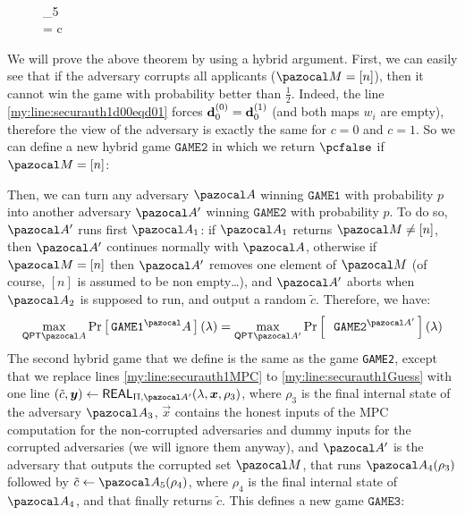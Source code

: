 \begin{proofE}
\begin{figure}[htb]
{{        \\
        \label{my:line:securauth1Guess} \gets \cA_5\\
        \pcreturn {} = c
      }}
    \caption{}
    \label{fig:gameFormalBlindAuthBlindCanDist}
  \end{figure}
  We will prove the above theorem by using a hybrid argument. First, we can easily see that if the adversary corrupts all applicants ($\cM = [n]$), then it cannot win the game with probability better than $\frac{1}{2}$. Indeed, the line \ref{my:line:securauth1d00eqd01} forces $\mathbf{d}_0^{(0)}=\mathbf{d}_0^{(1)}$ (and both maps $w_i$ are empty), therefore the view of the adversary is exactly the same for $c=0$ and $c=1$. So we can define a new hybrid game $\texttt{GAME2}$ in which we return $\pcfalse$ if $\cM = [n]$:
  \begin {pcimage}
    {\normalfont{}}
  \end{pcimage}
  Then, we can turn any adversary $\cA$ winning $\texttt{GAME1}$ with probability $p$ into another adversary $\cA'$ winning $\texttt{GAME2}$ with probability $p$. To do so, $\cA'$ runs first $\cA_1$: if $\cA_1$ returns $\cM \neq [n]$, then $\cA'$ continues normally with $\cA$, otherwise if $\cM = [n]$ then $\cA'$ removes one element of $\cM$ (of course, $[n]$ is assumed to be non empty\dots), and $\cA'$ aborts when $\cA_2$ is supposed to run, and output a random $\tilde{c}$. Therefore, we have:
  \begin{align}
    \max_{\QPT{} \cA} \pr{\texttt{GAME1}^\cA}(\lambda) = \max_{\QPT{} \cA'} \pr{\texttt{ GAME2}^{\cA'}}(\lambda)
  \end{align}
  The second hybrid game that we define is the same as the game \texttt{GAME2}, except that we replace lines \ref{my:line:securauth1MPC} to \ref{my:line:securauth1Guess} with one line $(\tilde{c}, \vec{y}) \gets \Real_{\Uppi,\cA'}(\lambda,\vec{x},\rho_3)$, where $\rho_3$ is the final internal state of the adversary $\cA_3$, $\vec{x}$ contains the honest inputs of the MPC computation for the non-corrupted adversaries and dummy inputs for the corrupted adversaries (we will ignore them anyway), and $\cA'$ is the adversary that outputs the corrupted set $\cM$, that runs $\cA_4(\rho_3)$ followed by $\tilde{c} \gets \cA_5(\rho_4)$, where $\rho_4$ is the final internal state of $\cA_4$, and that finally returns $\tilde{c}$. This defines a new game $\texttt{GAME3}$:

\end{proofE}
